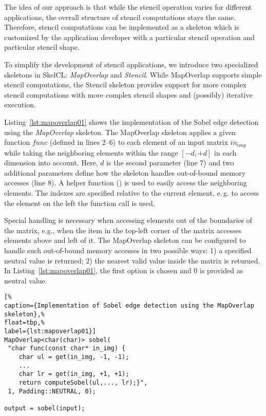 The idea of our approach is that while the stencil operation varies for different applications, the overall structure of stencil computations stays the same.
Therefore, stencil computations can be implemented as a skeleton which is customized by the application developer with a particular stencil operation and particular stencil shape.

To simplify the development of stencil applications, we introduce two specialized skeletons in SkelCL: \emph{MapOverlap} and \emph{Stencil}.
While MapOverlap supports simple stencil computations, the Stencil skeleton provides support for more complex stencil computations with more complex stencil shapes and (possibly) iterative execution.

Listing~\ref{lst:mapoverlap01} shows the implementation of the Sobel edge detection using the \emph{MapOverlap} skeleton.
The MapOverlap skeleton applies a given function $func$ (defined in lines 2--6) to each element of an input matrix $in_{img}$ while taking the neighboring elements within the range $[-d, +d]$ in each dimension into account.
Here, $d$ is the second parameter (line 7) and two additional parameters define how the skeleton handles out-of-bound memory accesses (line 8).
A helper function () is used to easily access the neighboring elements.
The indexes are specified relative to the current element, e.\,g. to access the element on the left the function call  is used.

Special handling is necessary when accessing elements out of the boundaries of the matrix, e.g., when the item in the top-left corner of the matrix accesses elements above and left of it.
The MapOverlap skeleton can be configured to handle such out-of-bound memory accesses in two possible ways:
1) a specified neutral value is returned;
2) the nearest valid value inside the matrix is returned.
In Listing~\ref{lst:mapoverlap01}, the first option is chosen and $0$ is provided as neutral value.

\begin{lstlisting}[%
caption={Implementation of Sobel edge detection using the MapOverlap skeleton},%
float=tbp,%
label={lst:mapoverlap01}]
MapOverlap<char(char)> sobel(
 "char func(const char* in_img) {
    char ul = get(in_img, -1, -1);
    ...
    char lr = get(in_img, +1, +1);
    return computeSobel(ul,..., lr);}",
 1, Padding::NEUTRAL, 0);

output = sobel(input);
\end{lstlisting}

